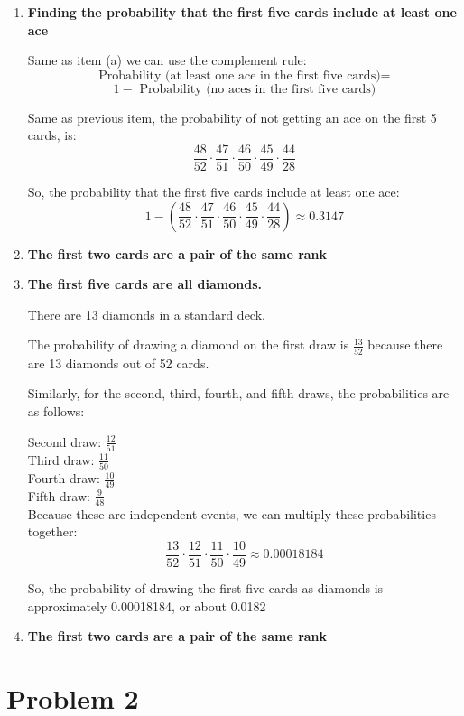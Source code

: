 {\begin{enumerate}
\begin{enumerate}
	\item \textbf{Finding the probability that the first five cards include at least one ace}
	
	Same as item (a) we can use the complement rule:
	\[ \text{Probability (at least one ace in the first five cards)} =\]
	\[ 1 - \text{ Probability (no aces in the first five cards)} \]
	
	Same as previous item, the probability of not getting an ace on the first 5 cards, is:
	\[ \frac{48}{52} \cdot \frac{47}{51} \cdot \frac{46}{50} \cdot \frac{45}{49} \cdot \frac{44}{28}\]
	
	So, the probability that the first five cards include at least one ace:
	\[ 1 - \left(\frac{48}{52} \cdot \frac{47}{51} \cdot \frac{46}{50} \cdot \frac{45}{49} \cdot \frac{44}{28} \right) \approx 0.3147 \]
	
	\item \textbf{The first two cards are a pair of the same rank}

	\item \textbf{The first five cards are all diamonds.}
	
	There are 13 diamonds in a standard deck.
	
	The probability of drawing a diamond on the first draw is $ \frac{13}{52} $ because there are 13 diamonds out of 52 cards.
	
	Similarly, for the second, third, fourth, and fifth draws, the probabilities are as follows:
	
	Second draw: $ \frac{12}{51} $\\
	Third draw: $ \frac{11}{50} $\\
	Fourth draw: $ \frac{10}{49} $\\
	Fifth draw: $ \frac{9}{48} $\\
	
	Because these are independent events, we can multiply these probabilities together:
	\[ \frac{13}{52} \cdot \frac{12}{51} \cdot \frac{11}{50} \cdot \frac{10}{49} \approx 0.00018184\]
	
	So, the probability of drawing the first five cards as diamonds is approximately 0.00018184, or about 0.0182%
	
	\item \textbf{The first two cards are a pair of the same rank}
		
	\end{enumerate}
	\end{enumerate}
	}

	\newpage
	\section*{Problem 2}\label{sec:prob-2}


